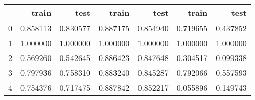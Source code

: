 \begin{tabular}{lrrrrrr}
\toprule
{} &     train &      test &     train &      test &     train &      test \\
\midrule
0 &  0.858113 &  0.830577 &  0.887175 &  0.854940 &  0.719655 &  0.437852 \\
1 &  1.000000 &  1.000000 &  1.000000 &  1.000000 &  1.000000 &  1.000000 \\
2 &  0.569260 &  0.542645 &  0.886423 &  0.847648 &  0.304517 &  0.099338 \\
3 &  0.797936 &  0.758310 &  0.883240 &  0.845287 &  0.792066 &  0.557593 \\
4 &  0.754376 &  0.717475 &  0.887842 &  0.852217 &  0.055896 &  0.149743 \\
\bottomrule
\end{tabular}
